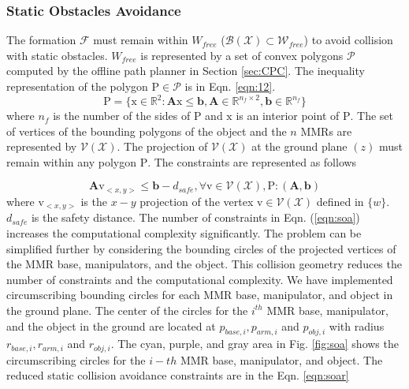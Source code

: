 \subsubsection{Static Obstacles Avoidance} \label{sec:soa}
The formation $\mathcal{F}$ must remain within $W_{free}$ ($\mathcal{B}(\mathcal{X})\subset\mathcal{W}_{free}$) to avoid collision with static obstacles. $W_{free}$ is represented by a set of convex polygons $\mathcal{P}$ computed by the offline path planner in Section \ref{sec:CPC}. The inequality representation of the polygon $\mathrm{P} \in \mathcal{P}$ is in Eqn. \eqref{eqn:12}.
\begin{equation}\label{eqn:12}
    \mathrm{P}=\{\textrm{x}\in\mathbb{R}^2:\mathbf{A}\textrm{x}\leq \boldsymbol{b}, \mathbf{A}\in\mathbb{R}^{n_f\times 2}, \boldsymbol{b}\in\mathbb{R}^{n_f}\}
\end{equation}
where $n_f$ is the number of the sides of $\mathrm{P}$ and $\textrm{x}$ is an interior point of $\mathrm{P}$. The set of vertices of the bounding polygons of the object and the $n$ MMRs are represented by $\mathscr{V(\mathcal{X})}$. The projection of $\mathscr{V(\mathcal{X})}$ at the ground plane $(z)$ must remain within any polygon $\mathrm{P}$. The constraints are represented as follows

\begin{equation}\label{eqn:soa}
\mathbf{A}\mathrm{v}_{<x,y>}\leq \boldsymbol{b} - d_{safe}, \forall\mathrm{v}\in\mathscr{V}(\mathcal{X}),\mathrm{P}:(\mathbf{A},\boldsymbol{b})
\end{equation}
where $\mathrm{v}_{<x,y>}$ is the $x-y$ projection of the vertex $\mathrm{v}\in\mathscr{V}(\mathcal{X})$ defined in $\{w\}$. $d_{safe}$ is the safety distance. The number of constraints in Eqn. (\eqref{eqn:soa}) increases the computational complexity significantly. The problem can be simplified further by considering the bounding circles of the projected vertices of the MMR base, manipulators, and the object. This collision geometry reduces the number of constraints and the computational complexity. We have implemented circumscribing bounding circles for each MMR base, manipulator, and object in the ground plane. The center of the circles for the $i^{th}$ MMR base, manipulator, and the object in the ground are located at $p_{base,i}, p_{arm,i}$ and $p_{obj,i}$ with radius $r_{base,i}, r_{arm,i}$ and $r_{obj,i}$. The cyan, purple, and gray area in Fig. \ref{fig:soa} shows the circumscribing circles for the $i-th$ MMR base, manipulator, and object. The reduced static collision avoidance constraints are in the Eqn. \eqref{eqn:soar}

